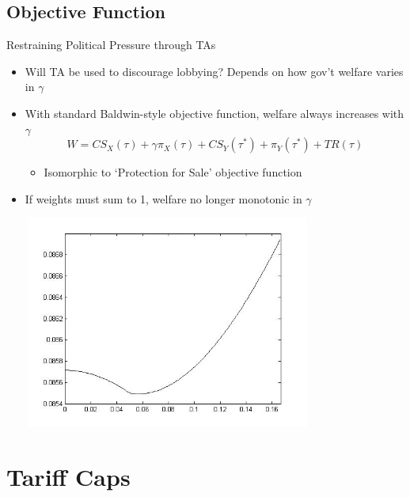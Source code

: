 \documentclass[handout]{beamer}
\newcommand{\ga}{\gamma}
\begin{document}
\subsection{Objective Function}
\begin{frame}{Restraining Political Pressure through TAs}
\pause
\begin{itemize}[<+->]
	\item Will TA be used to discourage lobbying? Depends on how gov't welfare varies in $\ga$
	\item With standard Baldwin-style objective function, welfare always increases with $\ga$
\[
  W = \mathit{CS}_X(\tau) + \ga \pi_X(\tau) + \mathit{CS}_Y(\tau^*) + \pi_Y(\tau^*) + \mathit{TR}(\tau)
\] 

	\begin{itemize}
		\item Isomorphic to `Protection for Sale' objective function
	\end{itemize}

	\item If weights must sum to 1, welfare no longer monotonic in $\ga$
\end{itemize}
\end{frame}

\begin{frame}
\includegraphics[height=2.75in, width=4.25in]{weight.jpg}
\end{frame}


\section{Tariff Caps}
\end{document}
